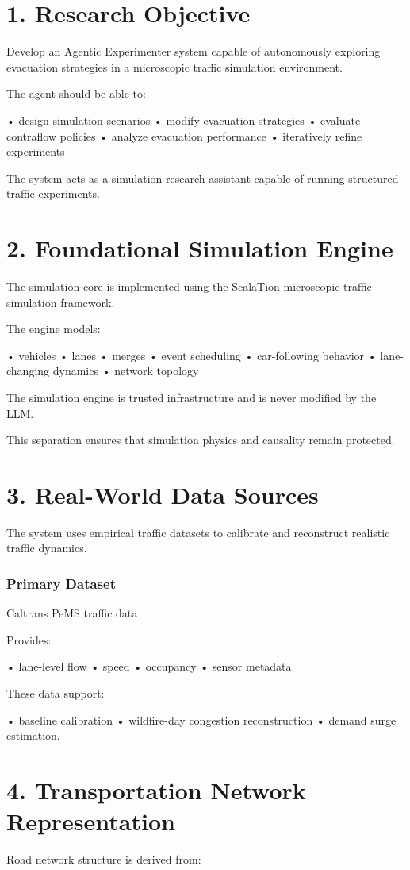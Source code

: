 \chapter*{1. Research Objective}
Develop an Agentic Experimenter system capable of autonomously exploring evacuation strategies in a microscopic traffic simulation environment.

The agent should be able to:

• design simulation scenarios
• modify evacuation strategies
• evaluate contraflow policies
• analyze evacuation performance
• iteratively refine experiments

The system acts as a simulation research assistant capable of running structured traffic experiments.

\chapter*{2. Foundational Simulation Engine}
The simulation core is implemented using the ScalaTion microscopic traffic simulation framework.

The engine models:

• vehicles
• lanes
• merges
• event scheduling
• car-following behavior
• lane-changing dynamics
• network topology

The simulation engine is trusted infrastructure and is never modified by the LLM.

This separation ensures that simulation physics and causality remain protected.

\chapter*{3. Real-World Data Sources}
The system uses empirical traffic datasets to calibrate and reconstruct realistic traffic dynamics.

\subsection*{Primary Dataset}
Caltrans PeMS traffic data

Provides:

• lane-level flow
• speed
• occupancy
• sensor metadata

These data support:

• baseline calibration
• wildfire-day congestion reconstruction
• demand surge estimation.

\chapter*{4. Transportation Network Representation}
Road network structure is derived from:

